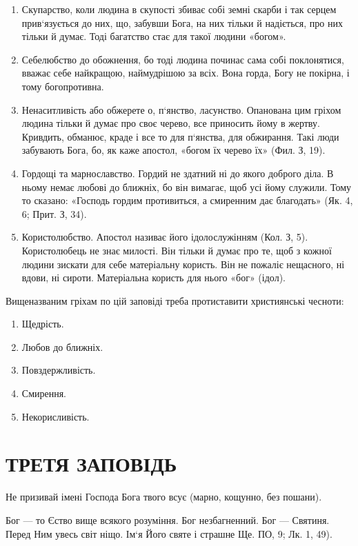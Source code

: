 \documentclass[main.tex]{subfiles}
\begin{document}
\begin{enumerate}
    \item Скупарство, коли людина в скупості збиває собі земні скарби і так серцем прив`язується до них, що, забувши Бога, на них тільки й надіється, про них тільки й думає. Тоді багатство стає для такої людини «богом».
    \item Себелюбство до обожнення, бо тоді людина починає сама собі поклонятися, вважає себе найкращою, наймудрішою за всіх. Вона горда, Богу не покірна, і тому богопротивна.
    \item Ненаситливість або обжерете о, п`янство, ласунство. Опанована цим гріхом людина тільки й думає про своє черево, все приносить йому в жертву. Кривдить, обманює, краде і все то для п`янства, для обжирання. Такі люди забувають Бога, бо, як каже апостол, «богом їх черево їх» (Фил. З, 19).
    \item Гордощі та марнославство. Гордий не здатний ні до якого доброго діла. В ньому немає любові до ближніх, бо він вимагає, щоб усі йому служили. Тому то сказано: «Господь гордим противиться, а смиренним дає благодать» (Як. 4, 6; Прит. З, 34).
    \item Користолюбство. Апостол називає його ідолослужінням (Кол. З, 5). Користолюбець не знає милості. Він тільки й думає про те, щоб з кожної людини зискати для себе матеріальну користь. Він не пожаліє нещасного, ні вдови, ні сироти. Матеріальна користь для нього «бог» (ідол).
\end{enumerate}

Вищеназваним гріхам по цій заповіді треба протиставити християнські чесноти:
\begin{enumerate}
    \item Щедрість.
    \item Любов до ближніх.
    \item Повздержливість.
    \item Смирення.
    \item Некорисливість.
\end{enumerate}

\section{ТРЕТЯ ЗАПОВІДЬ}

Не призивай імені Господа Бога твого всує (марно, кощунно, без пошани).

Бог — то Єство вище всякого розуміння. Бог незбагненний. Бог — Святиня. Перед Ним увесь світ ніщо. Ім`я Його святе і страшне Ще. ПО, 9; Лк. 1, 49).
\end{document}
